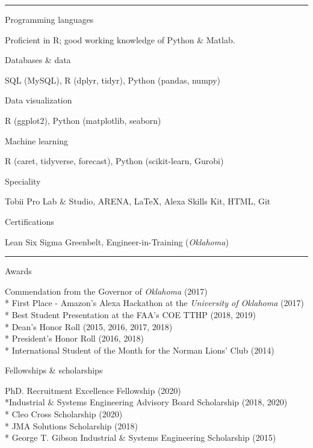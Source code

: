 \documentclass[a4paper,10pt]{article}
\newlength{\cvcolumngapwidth}
\newlength{\cvleftcolumnwidth}
\newlength{\cvrightcolumnwidth}
\newcommand{\cvsectionstyle}[1]{{\cvsectionfont\textcolor{cvsectioncolor}{#1}}}
\newcommand{\cvheadingstyle}[1]{{\normalsize\cvheadingfont\textcolor{cvheadingcolor}{#1}}}
\newlength{\cvafteritemskipamount}
\newlength{\cvaftersectionskipamount}
\newlength{\cvbetweensectionandheadingextraskipamount}
\newlength{\cvparskip}
\newcommand{\cvsection}[1]{
    \begin{minipage}[t]{\cvleftcolumnwidth}
        \raggedleft\cvsectionstyle{#1}
    \end{minipage}%
    \hspace{\cvcolumngapwidth}%
    \begin{minipage}[t]{\cvrightcolumnwidth}
        \textcolor{cvrulecolor}{\rule{\cvrightcolumnwidth}{0.3mm}}
    \end{minipage}

    \vspace{\cvaftersectionskipamount}
}
\newcommand{\cvitem}[2]{
    \begin{minipage}[t]{\cvleftcolumnwidth}
        \raggedleft #1
    \end{minipage}%
    \hspace{\cvcolumngapwidth}%
    \begin{minipage}[t]{\cvrightcolumnwidth}
        \setlength{\parskip}{\cvparskip} #2
    \end{minipage}

    \vspace{\cvafteritemskipamount}
}
\begin{document}
\cvsection{TECHNICAL SKILLS}

\vspace{\cvbetweensectionandheadingextraskipamount}

\cvitem{
    \cvheadingstyle{Programming languages}
}{
    Proficient in R; good working knowledge of Python \& Matlab. 
}

\cvitem{
    \cvheadingstyle{Databases \& data}
}{
    SQL (MySQL), R (dplyr, tidyr), Python (pandas, numpy)
}

\cvitem{
    \cvheadingstyle{Data visualization}
}{
    R (ggplot2), Python (matplotlib, seaborn)
}

\cvitem{
    \cvheadingstyle{Machine learning}
}{
    R (caret, tidyverse, forecast), Python (scikit-learn, Gurobi)
}

\cvitem{
    \cvheadingstyle{Speciality}
}{
    Tobii Pro Lab \& Studio, ARENA, \LaTeX, Alexa Skills Kit, HTML, Git
}

\cvitem{
    \cvheadingstyle{Certifications}
}{
    Lean Six Sigma Greenbelt, Engineer-in-Training (\emph{Oklahoma})
}



\cvsection{HONORS \& PROFESSIONAL ORGANIZATIONS}

\vspace{\cvbetweensectionandheadingextraskipamount}

\cvitem{
    \cvheadingstyle{Awards}
}{
    Commendation from the Governor of \emph{Oklahoma} \hfill{(2017)}
    \\* First Place - Amazon's Alexa Hackathon at the \emph{University of Oklahoma} \hfill{(2017)}
    \\* Best Student Presentation at the FAA's COE TTHP \hfill{(2018, 2019)}
    \\* Dean's Honor Roll \hfill{(2015, 2016, 2017, 2018)}
    \\* President's Honor Roll \hfill{(2016, 2018)}
    \\* International Student of the Month for the Norman Lions' Club \hfill{(2014)}

}

\cvitem{
    \cvheadingstyle{Fellowships \& scholarships}
}{
PhD. Recruitment Excellence Fellowship \hfill{(2020)}
\\*Industrial \& Systems Engineering Advisory Board Scholarship \hfill{(2018, 2020)}
\\* Cleo Cross Scholarship \hfill{(2020)}
\\* JMA Solutions Scholarship \hfill{(2018)}
\\* George T. Gibson Industrial & Systems Engineering Scholarship \hfill{(2015)}

}
\end{document}
